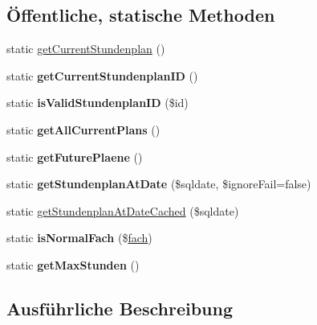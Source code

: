 \subsection*{Öffentliche, statische Methoden}
\begin{DoxyCompactItemize}
\item 
static \mbox{\hyperlink{classstundenplandata_ad6b7a729e0215de0326cee02d2ad34ec}{get\+Current\+Stundenplan}} ()
\item 
\mbox{\label{classstundenplandata_a8ac90f7cef058f733217dc733a147e6b}} 
static {\bfseries get\+Current\+Stundenplan\+ID} ()
\item 
\mbox{\label{classstundenplandata_afaba35d3f86ac03eefddb1ccc326d3da}} 
static {\bfseries is\+Valid\+Stundenplan\+ID} (\$id)
\item 
\mbox{\label{classstundenplandata_a86484bd35b91e7e17c9af244563cfda5}} 
static {\bfseries get\+All\+Current\+Plans} ()
\item 
\mbox{\label{classstundenplandata_a7bbb7cfbcd5565796ee2ab6e894046a5}} 
static {\bfseries get\+Future\+Plaene} ()
\item 
\mbox{\label{classstundenplandata_a8aab94aabb9e5aeed4c6bc313c0ffecb}} 
static {\bfseries get\+Stundenplan\+At\+Date} (\$sqldate, \$ignore\+Fail=false)
\item 
static \mbox{\hyperlink{classstundenplandata_a463003255e07f1b887318d75101975bd}{get\+Stundenplan\+At\+Date\+Cached}} (\$sqldate)
\item 
\mbox{\label{classstundenplandata_ad3d5e509297a346bacbe4185e83c3743}} 
static {\bfseries is\+Normal\+Fach} (\$\mbox{\hyperlink{classfach}{fach}})
\item 
\mbox{\label{classstundenplandata_abcb142faddf0272801f1175fbb0eb352}} 
static {\bfseries get\+Max\+Stunden} ()
\end{DoxyCompactItemize}


\subsection{Ausführliche Beschreibung}



